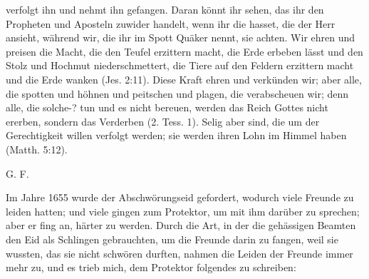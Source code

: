 {    verfolgt ihn und nehmt ihn gefangen. Daran könnt ihr sehen, das
    ihr den Propheten und Aposteln zuwider handelt, wenn ihr die hasset,
    die der Herr ansieht, während wir, die ihr im Spott Quäker
    nennt, sie achten. Wir ehren und preisen die Macht, die den
    Teufel erzittern macht, die Erde erbeben lässt und den Stolz und
    Hochmut niederschmettert, die Tiere auf den Feldern erzittern
    macht und die Erde wanken (Jes. 2:11). 
    Diese Kraft ehren
    und verkünden wir; aber alle, die spotten und höhnen und
    peitschen und plagen, die verabscheuen 
    wir; denn alle, die solche-?
    tun und es nicht bereuen, werden das Reich 
    Gottes nicht ererben,
    sondern das Verderben (2. Tess. 1).
    Selig aber sind, die um der Gerechtigkeit willen verfolgt
    werden; sie werden ihren Lohn im Himmel haben 
    (Matth. 5:12).

    \bigskip

    \begin{flushright}G. F.\end{flushright}
}

Im Jahre 1655 wurde der 
Abschwörungseid gefordert, wodurch
viele Freunde zu leiden hatten; und viele gingen zum Protektor, um
mit ihm darüber zu sprechen; aber er fing an, härter zu werden.
Durch die Art, in der die gehässigen Beamten den Eid als
Schlingen gebrauchten, um die Freunde darin zu fangen, weil sie
wussten, das sie nicht schwören durften, nahmen die Leiden der
Freunde immer mehr zu, und es trieb mich, 
dem Protektor folgendes zu schreiben:

